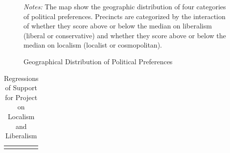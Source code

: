 \documentclass[article,12pt]{memoir}
\begin{document}
\begin{SingleSpacing}
\begin{figure}[tb]\centering
  \caption{Geographical Distribution of Political Preferences}
  \label{fig:hg_g_map_types}
  \begin{measuredfigure}
  \end{measuredfigure}
  \begin{tablenotes}[flushleft]
    \item \hspace{-.2em}\emph{Notes:} The map show the geographic distribution of four categories of political preferences. Precincts are categorized by the interaction of whether they score above or below the median on liberalism (liberal or conservative) and whether they score above or below the median on localism (localist or cosmopolitan).
  \end{tablenotes}
\end{figure}


\begin{landscape}

\begin{table}
  \caption{Regressions of Support for Project on Localism and Liberalism}
  \label{tab:hg_g_support_regression}
  \begin{threeparttable}
  \scriptsize
  \begin{tabularx}{\linewidth}{X}
  \centering


\end{tabularx}
\end{threeparttable}
\end{table}
\end{landscape}
\end{SingleSpacing}
\end{document}
